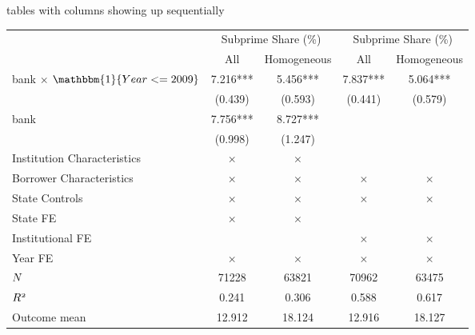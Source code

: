 \documentclass[notes,11pt, aspectratio=169]{beamer}
\begin{document}
\begin{frame}{tables with columns showing up sequentially}
\begin{table}
\centering
\begin{adjustbox}{max width=0.75\textwidth}
\begin{tabular}{lc<{\onslide<2->}c<{\onslide<3->}cc<{\onslide}}
  \toprule
  &\multicolumn{2}{c}{Subprime Share (\%)}&\multicolumn{2}{c}{Subprime Share (\%)}\\\cmidrule(lr){2-3}\cmidrule(lr){4-5}
  &\multicolumn{1}{c}{All}&\multicolumn{1}{c}{Homogeneous}&\multicolumn{1}{c}{All}&\multicolumn{1}{c}{Homogeneous}\\
  \midrule
  bank $\times$ $\mathbbm{1}\{ Year <=2009 \}$&    7.216***&    5.456***&    7.837***&    5.064***\\
                  &  (0.439)   &  (0.593)   &  (0.441)   &  (0.579)   \\
  \addlinespace
  bank            &    7.756***&    8.727***&            &            \\
                  &  (0.998)   &  (1.247)   &            &            \\
  \addlinespace
  Institution Characteristics & $\times$   & $\times$   &            &            \\
  \addlinespace
  Borrower Characteristics & $\times$   & $\times$   & $\times$   & $\times$   \\
  \addlinespace
  State Controls  & $\times$   & $\times$   & $\times$   & $\times$   \\
  \addlinespace
  State FE        & $\times$   & $\times$   &            &            \\
  \addlinespace
  Institutional FE&            &            & $\times$   & $\times$   \\
  \addlinespace
  Year FE         & $\times$   & $\times$   & $\times$   & $\times$   \\
  \midrule
  $\mathnormal{N}$&    71228   &    63821   &    70962   &    63475   \\
  $\mathnormal{R^2}$&    0.241   &    0.306   &    0.588   &    0.617   \\
  Outcome mean    &   12.912   &   18.124   &   12.916   &   18.127   \\
  \bottomrule
  \end{tabular}
\end{adjustbox}
\end{table}
\end{frame}
\end{document}
